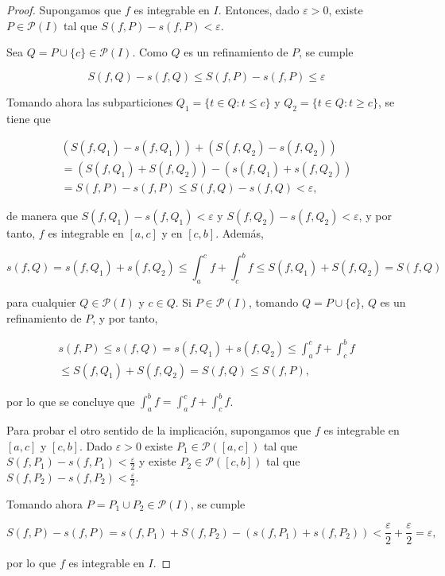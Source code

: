 \documentclass[
  a4paper,
]{scrreport}
\theoremstyle{definition}
\theoremstyle{definition}
\theoremstyle{definition}
\theoremstyle{plain}
\theoremstyle{plain}
\theoremstyle{plain}
\theoremstyle{remark}
\begin{document}
\begin{tcolorbox}[enhanced jigsaw, bottomtitle=1mm, title=\textcolor{quarto-callout-note-color}{\faInfo}\hspace{0.5em}{Demostración}, colbacktitle=quarto-callout-note-color!10!white, coltitle=black, leftrule=.75mm, colback=white, toptitle=1mm, toprule=.15mm, titlerule=0mm, opacitybacktitle=0.6, colframe=quarto-callout-note-color-frame, bottomrule=.15mm, arc=.35mm, rightrule=.15mm, breakable, left=2mm, opacityback=0]

\begin{proof}
Supongamos que \(f\) es integrable en \(I\). Entonces, dado
\(\varepsilon>0\), existe \(P\in\mathcal{P}(I)\) tal que
\(S(f,P)-s(f,P)<\varepsilon\).

Sea \(Q=P\cup\{c\}\in\mathcal{P}(I)\). Como \(Q\) es un refinamiento de
\(P\), se cumple

\[
S(f,Q)-s(f,Q) \leq S(f,P)-s(f,P) \leq \varepsilon
\]

Tomando ahora las subparticiones \(Q_1=\{t\in Q:t\leq c\}\) y
\(Q_2=\{t\in Q: t\geq c\}\), se tiene que

\[
\begin{gathered}
(S(f,Q_1)-s(f,Q_1)) + (S(f,Q_2)-s(f,Q_2)) \\
= (S(f,Q_1) + S(f,Q_2)) - (s(f,Q_1) + s(f,Q_2)) \\
= S(f,P) - s(f,P) \leq S(f,Q) - s(f,Q) < \varepsilon,
\end{gathered}
\]

de manera que \(S(f,Q_1)-s(f,Q_1)<\varepsilon\) y
\(S(f,Q_2)-s(f,Q_2)<\varepsilon\), y por tanto, \(f\) es integrable en
\([a,c]\) y en \([c,b]\). Además,

\[
s(f,Q) = s(f,Q_1) + s(f,Q_2) \leq \int_a^c f + \int_c^b f \leq S(f,Q_1) + S(f,Q_2) = S(f,Q)
\]

para cualquier \(Q\in\mathcal{P}(I)\) y \(c\in Q\). Si
\(P\in\mathcal{P}(I)\), tomando \(Q=P\cup \{c\}\), \(Q\) es un
refinamiento de \(P\), y por tanto,

\[
\begin{gathered}
s(f,P) \leq s(f,Q) = s(f,Q_1) + s(f,Q_2) \leq \int_a^c f + \int_c^b f \\
\leq S(f,Q_1) + S(f,Q_2) = S(f,Q) \leq S(f,P),
\end{gathered}
\]

por lo que se concluye que \(\int_a^b f = \int_a^c f + \int_c^b f\).

Para probar el otro sentido de la implicación, supongamos que \(f\) es
integrable en \([a,c]\) y \([c,b]\). Dado \(\varepsilon>0\) existe
\(P_1\in\mathcal{P}([a,c])\) tal que
\(S(f,P_1)-s(f,P_1)<\frac{\varepsilon}{2}\) y existe
\(P_2\in\mathcal{P}([c,b])\) tal que
\(S(f,P_2)-s(f,P_2)<\frac{\varepsilon}{2}\).

Tomando ahora \(P=P_1\cup P_2\in \mathcal{P}(I)\), se cumple

\[
S(f,P)-s(f,P) = s(f,P_1) + S(f,P_2) - (s(f,P_1) + s(f,P_2)) < \frac{\varepsilon}{2}+\frac{\varepsilon}{2} =\varepsilon,
\]

por lo que \(f\) es integrable en \(I\).
\end{proof}

\end{tcolorbox}
\end{document}
